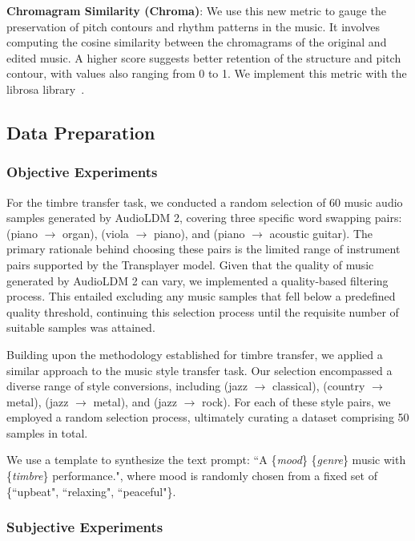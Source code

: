 \noindent\textbf{Chromagram Similarity (Chroma)}: We use this new metric to gauge the preservation of pitch contours and rhythm patterns in the music. It involves computing the cosine similarity between the chromagrams of the original and edited music. A higher score suggests better retention of the structure and pitch contour, with values also ranging from 0 to 1. We implement this metric with the librosa library~\cite{librosa}.

\subsection{Data Preparation}

\subsubsection{Objective Experiments}

For the timbre transfer task, we conducted a random selection of 60 music audio samples generated by AudioLDM 2, covering three specific word swapping pairs: (piano $\rightarrow$ organ), (viola $\rightarrow$ piano), and (piano $\rightarrow$ acoustic guitar). The primary rationale behind choosing these pairs is the limited range of instrument pairs supported by the Transplayer model. Given that the quality of music generated by AudioLDM 2 can vary, we implemented a quality-based filtering process. This entailed excluding any music samples that fell below a predefined quality threshold, continuing this selection process until the requisite number of suitable samples was attained.

Building upon the methodology established for timbre transfer, we applied a similar approach to the music style transfer task. Our selection encompassed a diverse range of style conversions, including (jazz $\rightarrow$ classical), (country $\rightarrow$ metal), (jazz $\rightarrow$ metal), and (jazz $\rightarrow$ rock). For each of these style pairs, we employed a random selection process, ultimately curating a dataset comprising 50 samples in total. 

We use a template to synthesize the text prompt: ``A \{\textit{mood}\} \{\textit{genre}\} music with \{\textit{timbre}\} performance.", where mood is randomly chosen from a fixed set of \{``upbeat", ``relaxing", ``peaceful"\}.

\subsubsection{Subjective Experiments}


